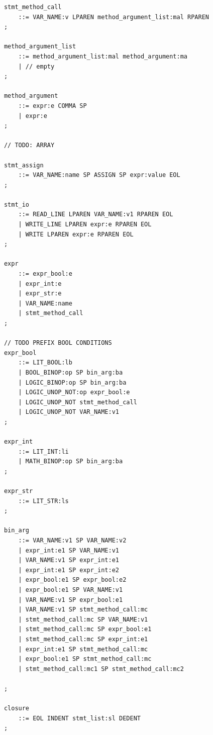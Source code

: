 \documentclass{article}
\begin{document}
\begin{lstlisting}
            stmt_method_call
            	::= VAR_NAME:v LPAREN method_argument_list:mal RPAREN
            ;
            
            method_argument_list
            	::= method_argument_list:mal method_argument:ma
            	| // empty
            ;
            
            method_argument
            	::= expr:e COMMA SP
            	| expr:e
            ;
            
            // TODO: ARRAY
            
            stmt_assign
            	::= VAR_NAME:name SP ASSIGN SP expr:value EOL
            ;
            
            stmt_io
            	::= READ_LINE LPAREN VAR_NAME:v1 RPAREN EOL
            	| WRITE_LINE LPAREN expr:e RPAREN EOL
            	| WRITE LPAREN expr:e RPAREN EOL
            ;
            
            expr
            	::= expr_bool:e
            	| expr_int:e
            	| expr_str:e
            	| VAR_NAME:name
            	| stmt_method_call
            ;
            
            // TODO PREFIX BOOL CONDITIONS
            expr_bool
            	::= LIT_BOOL:lb
            	| BOOL_BINOP:op SP bin_arg:ba
            	| LOGIC_BINOP:op SP bin_arg:ba
            	| LOGIC_UNOP_NOT:op expr_bool:e
            	| LOGIC_UNOP_NOT stmt_method_call
            	| LOGIC_UNOP_NOT VAR_NAME:v1
            ;
            
            expr_int
            	::= LIT_INT:li
            	| MATH_BINOP:op SP bin_arg:ba
            ;
            
            expr_str
            	::= LIT_STR:ls
            ;
            
            bin_arg
                ::= VAR_NAME:v1 SP VAR_NAME:v2
                | expr_int:e1 SP VAR_NAME:v1
                | VAR_NAME:v1 SP expr_int:e1
                | expr_int:e1 SP expr_int:e2
                | expr_bool:e1 SP expr_bool:e2
                | expr_bool:e1 SP VAR_NAME:v1
                | VAR_NAME:v1 SP expr_bool:e1
                | VAR_NAME:v1 SP stmt_method_call:mc	
                | stmt_method_call:mc SP VAR_NAME:v1
                | stmt_method_call:mc SP expr_bool:e1
                | stmt_method_call:mc SP expr_int:e1
                | expr_int:e1 SP stmt_method_call:mc
                | expr_bool:e1 SP stmt_method_call:mc
                | stmt_method_call:mc1 SP stmt_method_call:mc2
                    
            ;
            
            closure
            	::= EOL INDENT stmt_list:sl DEDENT
            ;
        \end{lstlisting}
\end{document}
